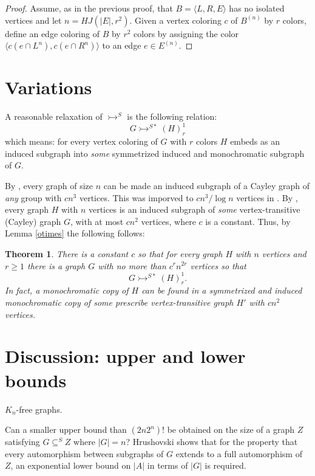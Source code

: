 \documentclass[11pt]{amsart}
\newcommand{\ars}{\rightarrowtail}
\newcommand{\rng}{\rangle}
\newcommand{\lng}{\langle}
\newcommand{\su}{\subseteq}
\newtheorem{theorem}{Theorem}[section]
\begin{document}
\begin{proof}
  Assume, as in the previous proof, that $B=\lng L,R,E\rng$ has no
  isolated vertices and let $n=HJ(|E|,r^2)$. Given a vertex coloring
  $c$ of $B^{(n)}$ by $r$ colors, define an edge coloring of $B$ by $r^2$
  colors by assigning the color $\lng c(e\cap L^n),c(e\cap R^n)\rng$ to an
  edge $e\in E^{(n)}$. 
\end{proof}

\section{Variations}

A reasonable relaxation of $\ars^S$ is the following relation:
\[G\ars^{S*}(H)^1_r\]
which means: for every vertex coloring of $G$ with
 $r$ colors $H$ embeds as an induced subgraph into \emph{some} 
 symmetrized induced and monochromatic subgraph of $G$. 



 By \cite{BS}, every graph of size $n$ can be made an induced subgraph
 of a Cayley graph of \emph{any} group with $cn^3$ vertices. This was
 imporved to $cn^3/\log n$ vertices in \cite{ALR}.  By \cite{BS}, every
 graph $H$ with $n$ vertices is an induced subgraph of \emph{some}
 vertex-transitive (Cayley) graph $G$, with at most $cn^2$ vertices,
 where $c$ is a constant. Thus, by Lemma \ref{otimes} the
 following follows:

\begin{theorem}\label{var}There is a constant $c$ so that for every
 graph $H$ with $n$ vertices and $r\ge 1$ there is  a graph $G$
with no more than 
 $c^rn^{2r}$ vertices  so that 
\[G\ars^{S*}(H)^1_r.\]
In fact, a monochromatic copy of $H$ can be found in a 
symmetrized and induced monochromatic copy of some prescribe
vertex-transitive graph $H'$ with $cn^2$ vertices. 
\end{theorem}




\section{Discussion: upper and lower bounds}

$K_n$-free graphs.


Can a smaller upper bound than $(2n2^n)!$ be obtained on the size of
a graph $Z$ satisfying $G\su^S Z$ where $|G|=n$?  Hrushovski \cite{H}
shows that for the property that every automorphism between subgraphs
of $G$ extends to a full automorphism of $Z$, an exponential lower
bound on $|A|$ in terms of $|G|$ is required.
\end{document}
